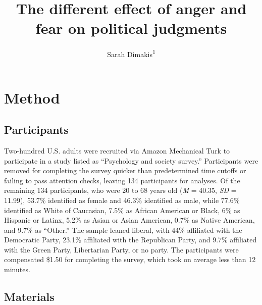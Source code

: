\documentclass[man,draftall]{apa6}
\title{The different effect of anger and fear on political judgments}
\author{Sarah Dimakis\textsuperscript{1}}
\date{}
\affiliation{
\vspace{0.5cm}
\textsuperscript{1} Univeristy of Oregon}
\begin{document}
\maketitle

\section{Method}\label{method}

\subsection{Participants}\label{participants}

Two-hundred U.S. adults were recruited via Amazon Mechanical Turk to
participate in a study listed as \enquote{Psychology and society
survey.} Participants were removed for completing the survey quicker
than predetermined time cutoffs or failing to pass attention checks,
leaving 134 participants for analyses. Of the remaining 134
participants, who were 20 to 68 years old (\emph{M} = 40.35, \emph{SD} =
11.99), 53.7\% identified as female and 46.3\% identified as male, while
77.6\% identified as White of Caucasian, 7.5\% as African American or
Black, 6\% as Hispanic or Latinx, 5.2\% as Asian or Asian American,
0.7\% as Native American, and 9.7\% as \enquote{Other.} The sample
leaned liberal, with 44\% affiliated with the Democratic Party, 23.1\%
affiliated with the Republican Party, and 9.7\% affiliated with the
Green Party, Libertarian Party, or no party. The participants were
compensated \$1.50 for completing the survey, which took on average less
than 12 minutes.

\subsection{Materials}\label{materials}
\end{document}

